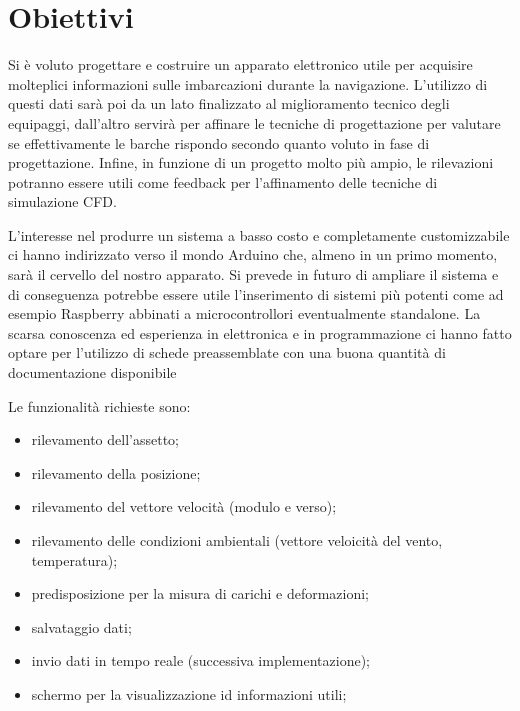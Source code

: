 
\chapter{Obiettivi}

Si è voluto progettare e costruire un apparato elettronico utile per acquisire molteplici informazioni sulle imbarcazioni durante la navigazione. L'utilizzo di questi dati sarà poi da un lato finalizzato al miglioramento tecnico degli equipaggi, dall'altro servirà per affinare le tecniche di progettazione per valutare se effettivamente le barche rispondo secondo quanto voluto in fase di progettazione. Infine, in funzione di un progetto molto più ampio, le rilevazioni potranno essere utili come feedback per l'affinamento delle tecniche di simulazione CFD.

L'interesse nel produrre un sistema a basso costo e completamente customizzabile ci hanno indirizzato verso il mondo Arduino che, almeno in un primo momento, sarà il cervello del nostro apparato. Si prevede in futuro di ampliare il sistema e di conseguenza potrebbe essere utile l'inserimento di sistemi più potenti come ad esempio Raspberry abbinati a microcontrollori eventualmente standalone. La scarsa conoscenza ed esperienza in elettronica e in programmazione ci hanno fatto optare per l'utilizzo di schede preassemblate con una buona quantità di documentazione disponibile


Le funzionalità richieste sono:
\begin{itemize}
\item rilevamento dell'assetto;
\item rilevamento della posizione;
\item rilevamento del vettore velocità (modulo e verso);
\item rilevamento delle condizioni ambientali (vettore veloicità del vento, temperatura);
\item predisposizione per la misura di carichi e deformazioni;
\item salvataggio dati;
\item invio dati in tempo reale (successiva implementazione);
\item schermo per la visualizzazione id informazioni utili;
\end{itemize}